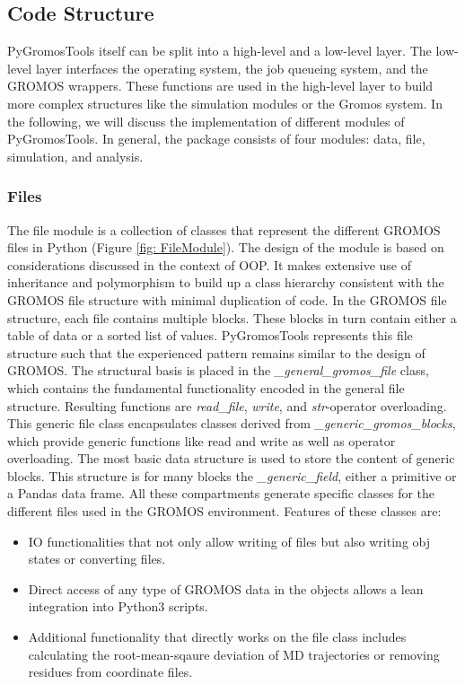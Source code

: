\subsection{Code Structure}
PyGromosTools itself can be split into a high-level and a low-level layer. 
The low-level layer interfaces the operating system, the job queueing system, and the GROMOS wrappers. These functions are used in the high-level layer to build more complex structures like the simulation modules or the Gromos system. 
%
In the following, we will discuss the implementation of different modules of PyGromosTools. In general, the package consists of four modules: data, file, simulation, and analysis.  


\subsubsection{Files}
The file module is a collection of classes that represent the different GROMOS files in Python (Figure \ref{fig: FileModule}). The design of the module is based on considerations discussed in the context of OOP. It makes extensive use of inheritance and polymorphism to build up a class hierarchy consistent with the GROMOS file structure with minimal duplication of  code.
In the GROMOS file structure, each file contains multiple blocks. These blocks in turn contain either a table of data or a sorted list of values. PyGromosTools represents this file structure such that the experienced pattern remains similar to the design of GROMOS. The structural basis is placed in the \textit{\_general\_gromos\_file} class, which contains the fundamental functionality encoded in the general file structure. Resulting functions are \textit{read\_file}, \textit{write}, and \textit{str}-operator overloading.
This generic file class encapsulates classes derived from \textit{\_generic\_gromos\_blocks}, which provide generic functions like read and write as well as operator overloading. 
The most basic data structure is used to store the content of generic blocks. This structure is for many blocks the \textit{\_generic\_field}, either a primitive or a Pandas data frame.
%
All these compartments generate specific classes for the different files used in the GROMOS environment. Features of these classes are: 
\begin{itemize}
    \item IO functionalities that not only allow writing of files but also writing obj states or converting files.
    \item Direct access of any type of GROMOS data in the objects allows a lean integration into Python3 scripts.
    \item Additional functionality that directly works on the file class includes calculating the root-mean-sqaure deviation of MD trajectories or removing residues from coordinate files.
\end{itemize}

